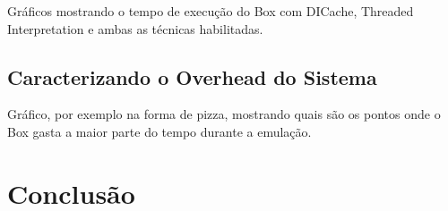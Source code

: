 \documentclass[11pt,twoside]{article}
\begin{document}
Gráficos mostrando o tempo de execução do Box com DICache, Threaded Interpretation
e ambas as técnicas habilitadas.

\subsection{Caracterizando o Overhead do Sistema}

Gráfico, por exemplo na forma de pizza, mostrando quais são os pontos onde o Box
gasta a maior parte do tempo durante a emulação.







\section{Conclusão}  \label{sec:conclusao}




\newpage

\end{document}
